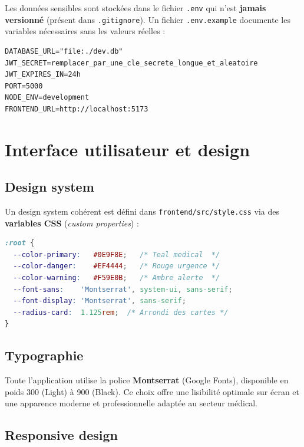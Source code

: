 \documentclass[12pt, a4paper]{report}
\begin{document}
Les données sensibles sont stockées dans le fichier \texttt{.env} qui n'est
\textbf{jamais versionné} (présent dans \texttt{.gitignore}). Un fichier
\texttt{.env.example} documente les variables nécessaires sans les valeurs
réelles :

\begin{lstlisting}[caption={Contenu de backend/.env.example}]
DATABASE_URL="file:./dev.db"
JWT_SECRET=remplacer_par_une_cle_secrete_longue_et_aleatoire
JWT_EXPIRES_IN=24h
PORT=5000
NODE_ENV=development
FRONTEND_URL=http://localhost:5173
\end{lstlisting}

\chapter{Interface utilisateur et design}

\section{Design system}

Un design system cohérent est défini dans \texttt{frontend/src/style.css}
via des \textbf{variables CSS} (\textit{custom properties}) :

\begin{lstlisting}[language=CSS, caption={Extrait des variables CSS globales}]
:root {
  --color-primary:   #0E9F8E;   /* Teal medical  */
  --color-danger:    #EF4444;   /* Rouge urgence */
  --color-warning:   #F59E0B;   /* Ambre alerte  */
  --font-sans:    'Montserrat', system-ui, sans-serif;
  --font-display: 'Montserrat', sans-serif;
  --radius-card:  1.125rem;  /* Arrondi des cartes */
}
\end{lstlisting}

\section{Typographie}

Toute l'application utilise la police \textbf{Montserrat} (Google Fonts),
disponible en poids 300 (Light) à 900 (Black). Ce choix offre une lisibilité
optimale sur écran et une apparence moderne et professionnelle adaptée au
secteur médical.

\section{Responsive design}
\end{document}
